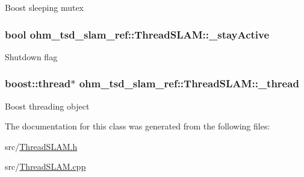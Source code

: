 Boost sleeping mutex \hypertarget{classohm__tsd__slam__ref_1_1ThreadSLAM_a303f8c9d58dca22db1f1f9c0e37cf6e4}{
\subsubsection[{\-\_\-stay\-Active}]{\setlength{\rightskip}{0pt plus 5cm}bool ohm\-\_\-tsd\-\_\-slam\-\_\-ref\-::\-Thread\-S\-L\-A\-M\-::\-\_\-stay\-Active\hspace{0.3cm}{\ttfamily [protected]}}}\label{classohm__tsd__slam__ref_1_1ThreadSLAM_a303f8c9d58dca22db1f1f9c0e37cf6e4}
Shutdown flag \hypertarget{classohm__tsd__slam__ref_1_1ThreadSLAM_af046376720757fbc1c2302809fd6ba07}{
\subsubsection[{\-\_\-thread}]{\setlength{\rightskip}{0pt plus 5cm}boost\-::thread$\ast$ ohm\-\_\-tsd\-\_\-slam\-\_\-ref\-::\-Thread\-S\-L\-A\-M\-::\-\_\-thread\hspace{0.3cm}{\ttfamily [protected]}}}\label{classohm__tsd__slam__ref_1_1ThreadSLAM_af046376720757fbc1c2302809fd6ba07}
Boost threading object 

The documentation for this class was generated from the following files\-:\begin{DoxyCompactItemize}
\item 
src/\hyperlink{ThreadSLAM_8h}{Thread\-S\-L\-A\-M.\-h}\item 
src/\hyperlink{ThreadSLAM_8cpp}{Thread\-S\-L\-A\-M.\-cpp}\end{DoxyCompactItemize}
